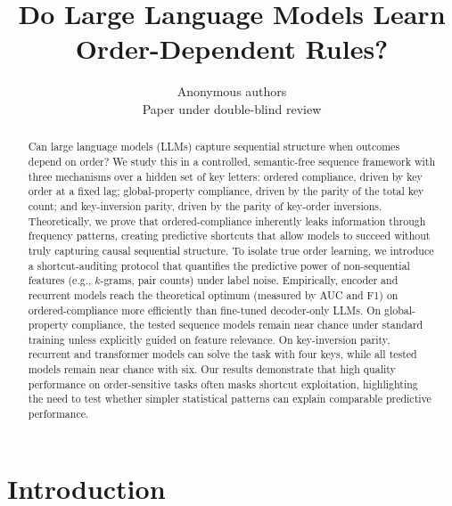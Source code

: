 \documentclass{article} %
\title{Do Large Language Models Learn Order-Dependent Rules?}
\author{Anonymous authors \\
Paper under double-blind review}
\theoremstyle{plain}
\theoremstyle{definition}
\theoremstyle{remark}
\begin{document}
\maketitle

\begin{abstract}
Can large language models (LLMs) capture sequential structure when outcomes depend on order? We study this in a controlled, semantic-free sequence framework with three mechanisms over a hidden set of key letters: ordered compliance, driven by key order at a fixed lag; global-property compliance, driven by the parity of the total key count; and key-inversion parity, driven by the parity of key-order inversions. Theoretically, we prove that ordered-compliance inherently leaks information through frequency patterns, creating predictive shortcuts that allow models to succeed without truly capturing causal sequential structure. To isolate true order learning, we introduce a shortcut-auditing protocol that quantifies the predictive power of non-sequential features (e.g., $k$-grams, pair counts) under label noise. Empirically, encoder and recurrent models reach the theoretical optimum (measured by AUC and F1) on ordered-compliance more efficiently than fine-tuned decoder-only LLMs. On global-property compliance, the tested sequence models remain near chance under standard training unless explicitly guided on feature relevance. On key-inversion parity, recurrent and transformer models can solve the task with four keys, while all tested models remain near chance with six. Our results demonstrate that high quality performance on order-sensitive tasks often masks shortcut exploitation, highlighting the need to test whether simpler statistical patterns can explain comparable predictive performance.
\end{abstract}

\section{Introduction}
\label{sec:introduction}
\end{document}
